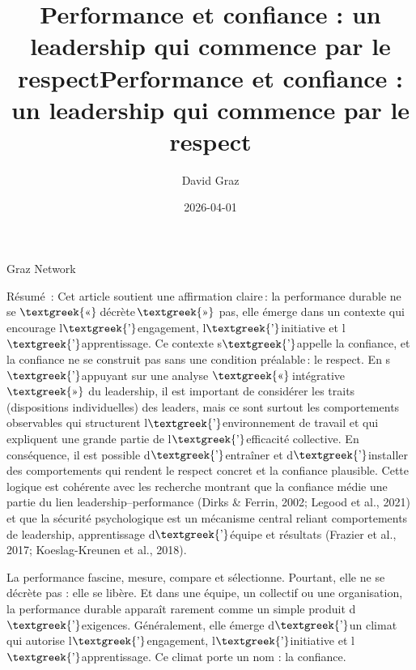 \documentclass{article}
\title{Performance et confiance : un leadership qui commence par le respect}
\author{David Graz}
\date{2026-04-01}
\begin{document}
\clearpage\title{Performance et confiance : un leadership qui commence par le respect}
\maketitle

Graz Network


\bigskip


\bigskip


\bigskip

Résumé : Cet article soutient une affirmation claire\leavevmode\allowbreak\,: la performance durable ne se
$\text{\textgreek{«}}$\leavevmode\allowbreak\,décrète\leavevmode\allowbreak\,$\text{\textgreek{»}}$ pas, elle émerge
dans un contexte qui encourage l$\text{\textgreek{’}}$engagement, l$\text{\textgreek{’}}$initiative et
l$\text{\textgreek{’}}$apprentissage. Ce contexte s$\text{\textgreek{’}}$appelle la confiance, et la confiance ne se
construit pas sans une condition préalable\leavevmode\allowbreak\,: le respect. En s$\text{\textgreek{’}}$appuyant sur
une analyse $\text{\textgreek{«}}$\leavevmode\allowbreak\,intégrative\leavevmode\allowbreak\,$\text{\textgreek{»}}$ du
leadership, il est important de considérer les traits (dispositions individuelles) des leaders, mais ce sont surtout
les comportements observables qui structurent l$\text{\textgreek{’}}$environnement de travail et qui expliquent une
grande partie de l$\text{\textgreek{’}}$efficacité collective. En conséquence, il est possible
d$\text{\textgreek{’}}$entraîner et d$\text{\textgreek{’}}$installer des comportements qui rendent le respect concret
et la confiance plausible. Cette logique est cohérente avec les recherche montrant que la confiance médie une partie du
lien leadership–performance \label{ref:RNDxgeyzVUFHQ}(Dirks \& Ferrin, 2002; Legood et al., 2021) et que la sécurité
psychologique est un mécanisme central reliant comportements de leadership, apprentissage d$\text{\textgreek{’}}$équipe
et résultats \label{ref:RNDo3M3FyKsg2}(Frazier et al., 2017; Koeslag-Kreunen et al., 2018).

\clearpage
La performance fascine, mesure, compare et sélectionne. Pourtant, elle ne se décrète pas : elle se libère. Et dans une
équipe, un collectif ou une organisation, la performance durable apparaît rarement comme un simple produit
d$\text{\textgreek{’}}$exigences. Généralement, elle émerge d$\text{\textgreek{’}}$un climat qui autorise
l$\text{\textgreek{’}}$engagement, l$\text{\textgreek{’}}$initiative et l$\text{\textgreek{’}}$apprentissage. Ce climat
porte un nom : la confiance.
\end{document}
